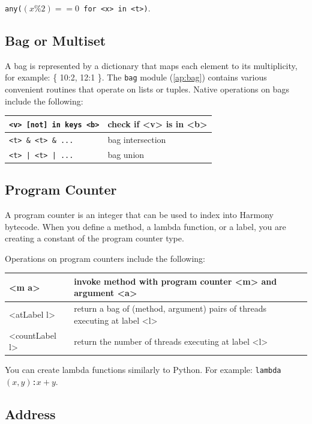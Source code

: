 \documentclass{report}
\begin{document}
{\texttt{any($(x \% 2) == 0$ for <{x}> in <{t}>)}.

\subsection*{Bag or Multiset}

A bag is represented by a dictionary that maps each element to its
multiplicity, for example: \{ 10:2, 12:1 \}.
The \texttt{bag} module (\autoref{ap:bag}) contains various
convenient routines that operate on lists or tuples.
Native operations on bags include the following:

\begin{center}
\begin{tabular}{|l|l|}
\hline
\texttt{<{v}> [not] in keys <{b}>} & check if <{v}> is in <{b}> \\
\hline
\texttt{<{t}> \& <{t}> \& ...} & bag intersection\\
\hline
\texttt{<{t}> | <{t}> | ...} & bag union \\
\hline
\end{tabular}
\end{center}

\subsection*{Program Counter}

A program counter is an integer that can be used to index into Harmony
bytecode.  When you define a method, a lambda function, or a label,
you are creating a constant of the program counter type.

Operations on program counters include the following:
\begin{center}
\begin{tabular}{|l|l|}
\hline
<{m a}> & invoke method with program counter <{m}> and argument <{a}>\\
\hline
<{atLabel l}> & return a bag of (method, argument) pairs of threads executing at label <{l}> \\ \hline
<{countLabel l}> & return the number of threads executing at label <{l}> \\
\hline
\end{tabular}
\end{center}

You can create lambda functions similarly to Python.  For example:
\texttt{lambda$(x,y)$:$x+y$}.

\subsection*{Address}

}
\end{document}

